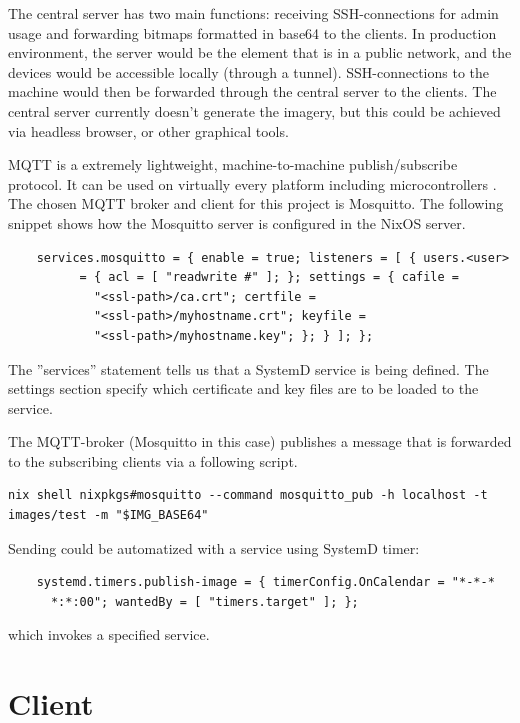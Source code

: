 The central server has two main functions: receiving SSH-connections
for admin usage and forwarding bitmaps formatted in base64 to the
clients. In production environment, the server would be the element
that is in a public network, and the devices would be accessible
locally (through a tunnel). SSH-connections to the machine would then
be forwarded through the central server to the clients. The central
server currently doesn't generate the imagery, but this could be
achieved via headless browser, or other graphical tools.

MQTT is a extremely lightweight, machine-to-machine publish/subscribe
protocol. It can be used on virtually every platform including
microcontrollers \cite{oasisopenMQTTVersion}. The chosen MQTT broker
and client for this project is Mosquitto. The following snippet shows
how the Mosquitto server is configured in the NixOS server.

\begin{lstlisting}
    services.mosquitto = { enable = true; listeners = [ { users.<user>
          = { acl = [ "readwrite #" ]; }; settings = { cafile =
            "<ssl-path>/ca.crt"; certfile =
            "<ssl-path>/myhostname.crt"; keyfile =
            "<ssl-path>/myhostname.key"; }; } ]; };
\end{lstlisting}

The ''services'' statement tells us that a SystemD service is being
defined. The settings section specify which certificate and key files
are to be loaded to the service.

The MQTT-broker (Mosquitto in this case) publishes a message that is
forwarded to the subscribing clients via a following script.

\begin{lstlisting}
nix shell nixpkgs#mosquitto --command mosquitto_pub -h localhost -t
images/test -m "$IMG_BASE64"
\end{lstlisting}

Sending could be automatized with a service using SystemD timer:
\begin{lstlisting}
    systemd.timers.publish-image = { timerConfig.OnCalendar = "*-*-*
      *:*:00"; wantedBy = [ "timers.target" ]; };
\end{lstlisting}

which invokes a specified service.

\section{Client}

